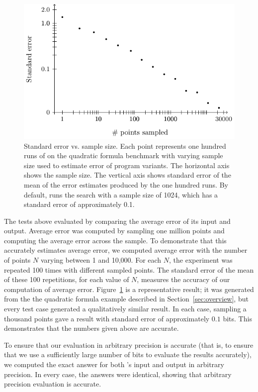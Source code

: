 \documentclass[paper.tex]{subfiles}
\begin{document}
\begin{figure}
\includegraphics[width=0.9\columnwidth]{fig/eval-err.pdf}
\caption{Standard error vs. sample size. Each point represents one
  hundred runs of \casio on the quadratic formula benchmark with
  varying sample size used to estimate error of program variants. The
  horizontal axis shows the sample size. The vertical axis shows
  standard error of the mean of the error estimates produced by the
  one hundred runs. By default, \casio runs the search with a sample
  size of 1024, which has a standard error of approximately 0.1.}

\label{fig:eval-err}
\end{figure}

The tests above evaluated \casio by comparing the average error of its
input and output.  Average error was computed by sampling one million
points and computing the average error across the sample.  To
demonstrate that this accurately estimates average error, we computed
average error with the number of points $N$ varying between 1 and
10,000.  For each $N$, the experiment was repeated 100 times with
different sampled points.  The standard error of the mean of these 100
repetitions, for each value of $N$, measures the accuracy of our
computation of average error.  Figure~\ref{fig:eval-err} is a
representative result; it was generated from the the quadratic formula
example described in Section~\ref{sec:overview}, but every test case
generated a qualitatively similar result.  In each case, sampling a
thousand points gave a result with standard error of approximately
$0.1$ bits.  This demonstrates that the numbers given above are
accurate.

To ensure that our evaluation in arbitrary precision is accurate (that
is, to ensure that we use a sufficiently large number of bits to
evaluate the results accurately), we computed the exact answer for
both \casio's input and output in arbitrary precision.  In every case,
the answers were identical, showing that arbitrary precision
evaluation is accurate.
\end{document}
